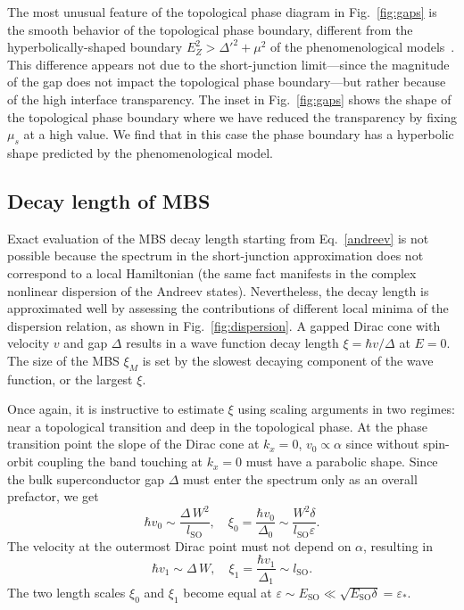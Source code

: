 The most unusual feature of the topological phase diagram in Fig.~\ref{fig:gaps} is the smooth behavior of the topological phase boundary, different from the hyperbolically-shaped boundary $E_Z^2 > \Delta'^2 + \mu^2$ of the phenomenological models~\cite{Lutchyn2010,Oreg2010,Lutchyn2011}.
This difference appears not due to the short-junction limit---since the magnitude of the gap does not impact the topological phase boundary---but rather because of the high interface transparency.
The inset in Fig.~\ref{fig:gaps} shows the shape of the topological phase boundary where we have reduced the transparency by fixing $\mu_s$ at a high value.
We find that in this case the phase boundary has a hyperbolic shape predicted by the phenomenological model.

\subsection{Decay length of MBS}

Exact evaluation of the MBS decay length starting from Eq.~\eqref{andreev} is not possible because the spectrum in the short-junction approximation does not correspond to a local Hamiltonian (the same fact manifests in the complex nonlinear dispersion of the Andreev states).
Nevertheless, the decay length is approximated well by assessing the contributions of different local minima of the dispersion relation, as shown in Fig.~\ref{fig:dispersion}.
A gapped Dirac cone with velocity $v$ and gap $\Delta$ results in a wave function decay length $\xi = \hbar v/\Delta$ at $E=0$.
The size of the MBS $\xi_M$ is set by the slowest decaying component of the wave function, or the largest $\xi$.

Once again, it is instructive to estimate $\xi$ using scaling arguments in two regimes: near a topological transition and deep in the topological phase.
At the phase transition point the slope of the Dirac cone at $k_x=0$, $v_0 \propto \alpha$ since without spin-orbit coupling the band touching at $k_x = 0$ must have a parabolic shape.
Since the bulk superconductor gap $\Delta$ must enter the spectrum only as an overall prefactor, we get
\begin{equation}\label{eq:v_k_0}
\hbar v_0 \sim \frac{\Delta\, W^2}{ l_\textrm{SO}},
\quad \xi_0 = \frac{\hbar v_0}{\Delta_0} \sim \frac{W^2 \delta}{l_\textrm{SO}\varepsilon}.
\end{equation}
The velocity at the outermost Dirac point must not depend on $\alpha$, resulting in
\begin{equation}\label{eq:v_k_f}
\hbar v_1 \sim \Delta\, W,
\quad \xi_1 = \frac{\hbar v_1}{\Delta_1} \sim l_\textrm{SO}.
\end{equation}
The two length scales $\xi_0$ and $\xi_1$ become equal at $\varepsilon \sim E_\textrm{SO} \ll \sqrt{E_\textrm{SO} \delta} = \varepsilon_*$.

